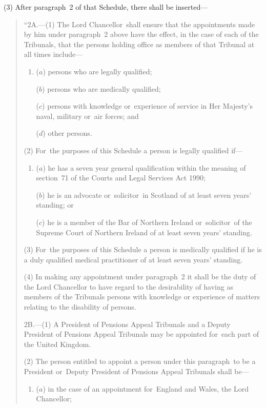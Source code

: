 \documentclass[12pt,a4paper]{article}
\begin{document}
(3) After paragraph~2 of that Schedule, there shall be inserted—
\begin{quotation}
“2A.---(1) The Lord Chancellor~shall ensure that the appointments made by him under paragraph~2 above have the effect, in the case of each of the Tribunals, that the persons holding office as members of that Tribunal at all times include—
\begin{enumerate}\item[]
($a$) persons who are legally qualified;

($b$) persons who are medically qualified;

($c$) persons with knowledge or~experience of service in Her Majesty’s naval, military or~air forces; and

($d$) other persons.
\end{enumerate}

(2) For~the purposes of this Schedule a person is legally qualified if—
\begin{enumerate}\item[]
($a$) he has a seven year general qualification within the meaning of section~71 of the Courts and Legal Services Act 1990;

($b$) he is an advocate or~solicitor~in Scotland of at least seven years' standing; or

($c$) he is a member of the Bar of Northern Ireland or~solicitor~of the Supreme Court of Northern Ireland of at least seven years' standing.
\end{enumerate}

(3) For~the purposes of this Schedule a person is medically qualified if he is a duly qualified medical practitioner of at least seven years' standing.

(4) In making any appointment under paragraph~2 it shall be the duty of the Lord Chancellor to have regard to the desirability of having as members of the Tribunals persons with knowledge or experience of matters relating to the disability of persons.

\medskip

2B.---(1) A President of Pensions Appeal Tribunals and a Deputy President of Pensions Appeal Tribunals may be appointed for~each part of the United Kingdom.

(2) The person entitled to appoint a person under this paragraph~to be a President or~Deputy President of Pensions Appeal Tribunals shall be—
\begin{enumerate}\item[]
($a$) in the case of an appointment for~England and Wales, the Lord Chancellor;


\end{enumerate}
\end{quotation}
\end{document}
